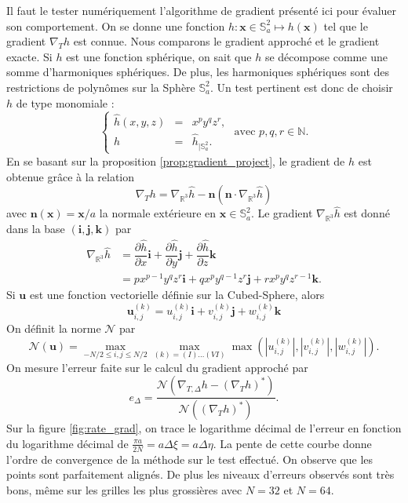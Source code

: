 Il faut le tester numériquement l'algorithme de gradient présenté ici pour évaluer son comportement. On se donne une fonction $h : \mathbf{x} \in \mathbb{S}_a^2 \mapsto h(\mathbf{x})$ tel que le gradient $\nabla_T h$ est connue. Nous comparons le gradient approché et le gradient exacte.
Si $h$ est une fonction sphérique, on sait que $h$ se décompose comme une somme d'harmoniques sphériques. De plus, les harmoniques sphériques sont des restrictions de polynômes sur la Sphère $\mathbb{S}_a^2$. Un test pertinent est donc de choisir $h$ de type monomiale :
\begin{equation}
\left\lbrace
\begin{array}{rcl}
\hat{h}(x,y,z) & = & x^p y^q z^r, \\
h & = & \hat{h}_{| \mathbb{S}_a^2}.
\end{array}
\right. \text{ avec } p,q,r \in \mathbb{N}.
\label{eq:grad_test}
\end{equation}
En se basant sur la proposition \ref{prop:gradient_project}, le gradient de $h$ est obtenue grâce à la relation
\begin{equation}
\nabla_T h = \nabla_{\mathbb{R}^3} \hat{h} - \mathbf{n} \left( \mathbf{n} \cdot \nabla_{\mathbb{R}^3} \hat{h} \right)
\end{equation}
avec $\mathbf{n}(\mathbf{x}) = \mathbf{x}/a$ la normale extérieure en $\mathbf{x} \in \mathbb{S}_a^2$. Le gradient $\nabla_{\mathbb{R}^3} \hat{h}$ est donné dans la base $(\mathbf{i}, \mathbf{j}, \mathbf{k})$ par 
\begin{align*}
\nabla_{\mathbb{R}^3} \hat{h} & = \dfrac{\partial \hat{h}}{\partial x} \mathbf{i} + \dfrac{\partial \hat{h}}{\partial y} \mathbf{j} + \dfrac{\partial \hat{h}}{\partial z} \mathbf{k}\\
                              & = p x^{p-1} y^q z^r \mathbf{i} + q x^p y^{q-1} z^r \mathbf{j} + r x^p y^q z^{r-1} \mathbf{k}.
\end{align*}
Si $\mathbf{u}$ est une fonction vectorielle définie sur la Cubed-Sphere, alors
\begin{equation}
\mathbf{u}_{i,j}^{(k)} = u_{i,j}^{(k)} \mathbf{i} + v_{i,j}^{(k)} \mathbf{j} + w_{i,j}^{(k)} \mathbf{k}
\end{equation}
On définit la norme $\mathcal{N}$ par
\begin{equation}
\mathcal{N}(\mathbf{u}) = \max_{-N/2 \leq i,j \leq N/2} \max_{(k) = (I) \ldots (VI)} \max (|u_{i,j}^{(k)}|, |v_{i,j}^{(k)}|, |w_{i,j}^{(k)}|).
\end{equation}
On mesure l'erreur faite sur le calcul du gradient approché par
\begin{equation}
e_{\Delta} = \dfrac{\mathcal{N}\left(\nabla_{T,\Delta}h - \left( \nabla_{T}h \right)^* \right)}{\mathcal{N}\left(\left( \nabla_{T}h \right)^* \right)}.
\end{equation}
Sur la figure \ref{fig:rate_grad}, on trace le logarithme décimal de l'erreur en fonction du logarithme décimal de $\frac{\pi a}{2 N} = a \Delta \xi = a \Delta \eta$. La pente de cette courbe donne l'ordre de convergence de la méthode sur le test effectué. On observe que les points sont parfaitement alignés. De plus les niveaux d'erreurs observés sont très bons, même sur les grilles les plus grossières avec $N=32$ et $N=64$.

